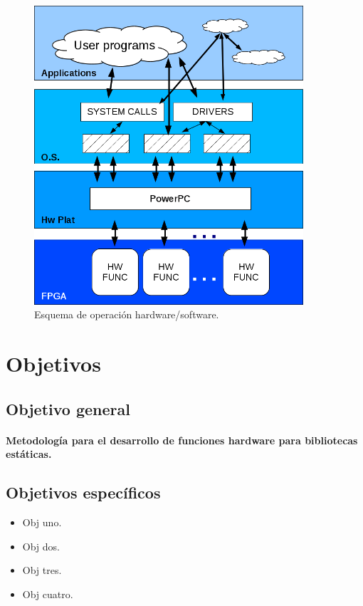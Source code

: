 \begin{figure}[h!]
  \centering
  \includegraphics[width=10cm]{fig/main-sch.png} 
  \caption {Esquema de operación hardware/software.}
  \label{main-sch}
\end{figure}



\section{Objetivos}
%
\subsection{Objetivo general}
\noindent \paragraph{Metodología para el desarrollo de funciones hardware para bibliotecas estáticas.}

\subsection{Objetivos específicos}
\begin{itemize}
\item Obj uno.
\item Obj dos.
\item Obj tres.
\item Obj cuatro.
\end{itemize}

